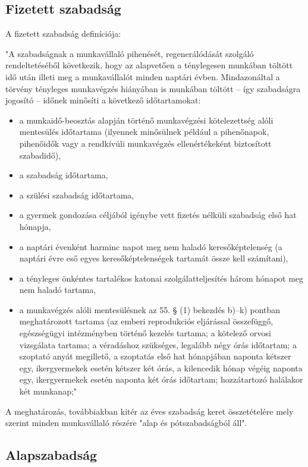 \subsection{Fizetett szabadság}

A fizetett szabadság definíciója: 

"A szabadságnak a munkavállaló pihenését, regenerálódását szolgáló rendeltetéséből következik, hogy az alapvetően a ténylegesen munkában töltött idő után illeti meg a munkavállalót minden naptári évben. Mindazonáltal a törvény tényleges munkavégzés hiányában is munkában töltött – így szabadságra jogosító – időnek minősíti a következő időtartamokat:
\begin{itemize}
\item a munkaidő-beosztás alapján történő munkavégzési kötelezettség alóli mentesülés időtartama (ilyennek minősülnek például a pihenőnapok, pihenőidők vagy a rendkívüli munkavégzés ellenértékeként biztosított szabadidő),
\item a szabadság időtartama,
\item a szülési szabadság időtartama,
\item a gyermek gondozása céljából igénybe vett fizetés nélküli szabadság első hat hónapja,
\item a naptári évenként harminc napot meg nem haladó keresőképtelenség (a naptári évre eső egyes keresőképtelenségek tartamát össze kell számítani),
\item a tényleges önkéntes tartalékos katonai szolgálatteljesítés három hónapot meg nem haladó tartama,
\item a munkavégzés alóli mentesülésnek az 55. § (1) bekezdés b)–k) pontban meghatározott tartama (az emberi reprodukciós eljárással összefüggő, egészségügyi intézményben történő kezelés tartama; a kötelező orvosi vizsgálata tartama; a véradáshoz szükséges, legalább négy órás időtartam; a szoptató anyát megillető, a szoptatás első hat hónapjában naponta kétszer egy, ikergyermekek esetén kétszer két órás, a kilencedik hónap végéig naponta egy, ikergyermekek esetén naponta két órás időtartam; hozzátartozó halálakor két munkanap;" \cite{fizetettSzabadsag}
\end{itemize}

A meghatározás, továbbiakban kitér az éves szabadság keret összetételére mely szerint minden munkavállaló részére "alap és pótszabadságból áll"\cite{fizetettSzabadsag}.

\subsection{Alapszabadság}

